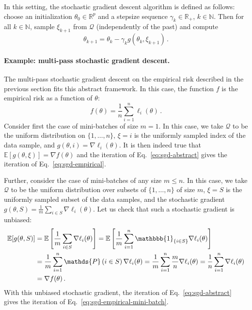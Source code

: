 \documentclass[11pt,reqno]{article}
\newcommand{\N}{\mathbb{N}}
\newcommand{\E}{\mathbb{E}}
\newcommand{\R}{\mathbb{R}}
\renewcommand{\P}{\mathds{P}}
\newcommand{\cQ}{\mathcal{Q}}
\renewcommand{\P}{\mathds{P}}
\renewcommand{\leq}{\leqslant}
\numberwithin{equation}{section}
\theoremstyle{plain}
\theoremstyle{definition}
\theoremstyle{remark}
\begin{document}
In this setting, the stochastic gradient descent algorithm is defined as follows: choose an initialization $\theta_0 \in \R^p$ and a stepsize sequence $\gamma_k \in \R_+$, $k \in \N$. Then for all $k \in \N$, sample $\xi_{k+1}$ from $\cQ$ (independently of the past) and compute
\begin{equation}
	\label{eq:sgd-abstract}
	\theta_{k+1} = \theta_k - \gamma_k g(\theta_k, \xi_{k+1}) \, .
\end{equation}

\paragraph{Example: multi-pass stochastic gradient descent.} The multi-pass stochastic gradient descent on the empirical risk described in the previous section fits this abstract framework. In this case, the function $f$ is the empirical risk as a function of $\theta$:
\begin{equation*}
	f(\theta) = \frac{1}{n} \sum_{i=1}^n \ell_i(\theta) \, .
\end{equation*}
Consider first the case of mini-batches of size $m=1$. In this case, we take $\cQ$ to be the uniform distribution on $\{1, \dots, n\}$, $\xi = i$ is the uniformly sampled index of the data sample, and $g(\theta, i) = \nabla \ell_i(\theta)$. It is then indeed true that $\E[g(\theta, \xi)] = \nabla f(\theta)$ and the iteration of Eq.~\eqref{eq:sgd-abstract} gives the iteration of Eq.~\eqref{eq:sgd-empirical}.

Further, consider the case of mini-batches of any size $m \leq n$. In this case, we take $\cQ$ to be the uniform distribution over subsets of $\{1, \dots, n\}$ of size $m$, $\xi = S$ is the uniformly sampled subset of the data samples, and the stochastic gradient $g(\theta, S) = \frac{1}{m} \sum_{i \in S} \nabla \ell_i(\theta)$. Let us check that such a stochastic gradient is unbiased:
\begin{align*}
	\E[g(\theta, S)] &= \E\left[\frac{1}{m} \sum_{i \in S} \nabla \ell_i(\theta)\right] = \E\left[\frac{1}{m} \sum_{i=1}^n \mathbbb{1}_{\{i \in S\}} \nabla \ell_i(\theta)\right] \\
	&= \frac{1}{m} \sum_{i=1}^n \P\left(i \in S\right) \nabla \ell_i(\theta) = \frac{1}{m} \sum_{i=1}^n \frac{m}{n} \nabla \ell_i(\theta) = \frac{1}{n} \sum_{i=1}^n \nabla \ell_i(\theta) \\
	&= \nabla f(\theta) \, .
\end{align*}
With this unbiased stochastic gradient, the iteration of Eq.~\eqref{eq:sgd-abstract} gives the iteration of Eq.~\eqref{eq:sgd-empirical-mini-batch}.
\end{document}
